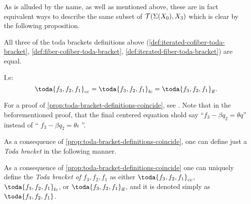 As is alluded by the name, as well as mentioned above, these are in fact equivalent ways to describe the same subset of \( {\mathcal{T}}(\Sigma(X_0), X_3) \) which is clear by the following proposition.

\begin{proposition}
    \label{prop:toda-bracket-definitions-coincide}
    All three of the toda brackets definitions above (\autoref{def:iterated-cofiber-toda-bracket}, \autoref{def:fiber-cofiber-toda-bracket}, \autoref{def:iterated-fiber-toda-bracket}) are equal.

    I.e:
    \[
        \toda{f_3, f_2, f_1}_{\cc} = \toda{f_3, f_2, f_1}_{\fc} = \toda{f_3, f_2, f_1}_{\ff}.
    \]
\end{proposition}

For a proof of \autoref{prop:toda-bracket-definitions-coincide}, see \cite[Proposition 3.3]{Christensen-Frankland_2017}. Note that in the beforementioned proof, that the final centered equation shold say ``\( f_3 - \beta q_2 = \theta q \)'' instead of `` \( f_3 - \beta q_2 = \theta \iota \) ''.

As a consequence of \autoref{prop:toda-bracket-definitions-coincide}, one can define just a \emph{Toda bracket} in the following manner.

\begin{definition}
    As a consequence of \autoref{prop:toda-bracket-definitions-coincide} one can uniquely define the \emph{Toda bracket of \( f_3, f_2, f_1 \)} as either \( \toda{f_3, f_2, f_1}_{\cc} \), \( \toda{f_3, f_2, f_1}_{\fc} \), or \( \toda{f_3, f_2, f_1}_{\ff} \), and it is denoted simply as \emph{\( \toda{f_3, f_2, f_1} \)}.
\end{definition}


